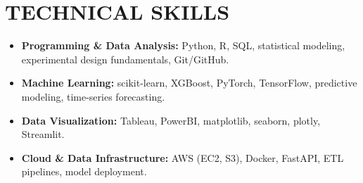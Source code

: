 \documentclass[a4paper,9pt]{extarticle}
\begin{document}
\section*{TECHNICAL SKILLS}

\begin{itemize}[leftmargin=0.5cm, label={}]
\item \textbf{Programming \& Data Analysis:} Python, R, SQL, statistical modeling, experimental design fundamentals, Git/GitHub. \\

\item \textbf{Machine Learning:} scikit-learn, XGBoost, PyTorch, TensorFlow, predictive modeling, time-series forecasting. \\

\item \textbf{Data Visualization:} Tableau, PowerBI, matplotlib, seaborn, plotly, Streamlit. \\

\item \textbf{Cloud \& Data Infrastructure:} AWS (EC2, S3), Docker, FastAPI, ETL pipelines, model deployment. \\
\end{itemize}
\end{document}
